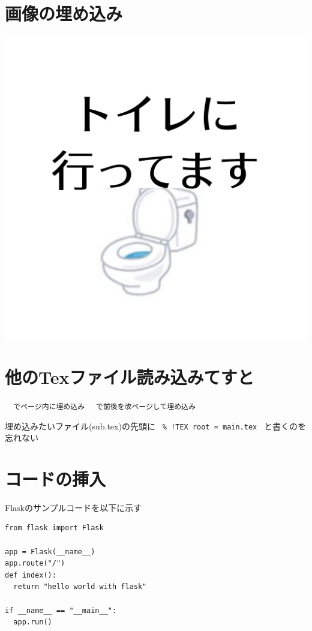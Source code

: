 \documentclass[a4paper, 12pt]{ltjsarticle}
\begin{document}
\section{画像の埋め込み}
\includegraphics[scale=0.5]{./image.jpg}



\section{他のTexファイル読み込みてすと}
\verb |  でページ内に埋め込み |
\verb | で前後を改ページして埋め込み|

埋め込みたいファイル(sub.tex)の先頭に
\verb | %
と書くのを忘れない




\section{コードの挿入}

Flaskのサンプルコードを以下に示す

\begin{lstlisting}[caption=main.py]
from flask import Flask

app = Flask(__name__)
app.route("/")
def index():
  return "hello world with flask"

if __name__ == "__main__":
  app.run()
\end{lstlisting}
\end{document}
